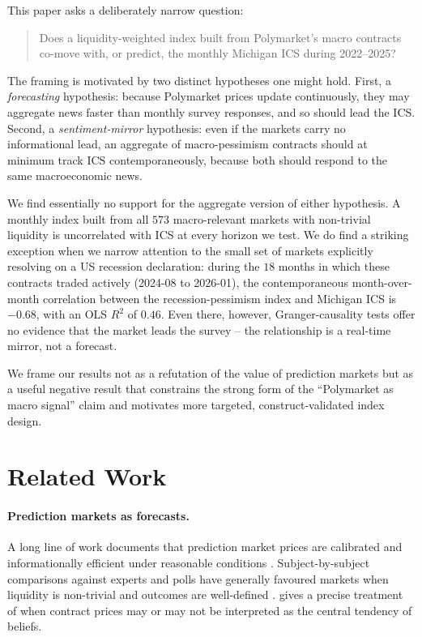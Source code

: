 \documentclass{article}
\begin{document}
This paper asks a deliberately narrow question:
\begin{quote}
Does a liquidity-weighted index built from Polymarket's macro contracts
co-move with, or predict, the monthly Michigan ICS during 2022--2025?
\end{quote}

The framing is motivated by two distinct hypotheses one might hold. First,
a \emph{forecasting} hypothesis: because Polymarket prices update
continuously, they may aggregate news faster than monthly survey responses,
and so should lead the ICS. Second, a \emph{sentiment-mirror} hypothesis:
even if the markets carry no informational lead, an aggregate of
macro-pessimism contracts should at minimum track ICS contemporaneously,
because both should respond to the same macroeconomic news.

We find essentially no support for the aggregate version of either
hypothesis. A monthly index built from all $573$ macro-relevant markets
with non-trivial liquidity is uncorrelated with ICS at every horizon we
test. We do find a striking exception when we narrow attention to the
small set of markets explicitly resolving on a US recession declaration:
during the $18$ months in which these contracts traded actively
(2024-08 to 2026-01), the contemporaneous month-over-month
correlation between the recession-pessimism index and Michigan ICS is
$-0.68$, with an OLS $R^2$ of $0.46$. Even there, however,
Granger-causality tests offer no evidence that the market leads the
survey -- the relationship is a real-time mirror, not a forecast.

We frame our results not as a refutation of the value of prediction
markets but as a useful negative result that constrains the strong form
of the ``Polymarket as macro signal'' claim and motivates more targeted,
construct-validated index design.

\section{Related Work}

\paragraph{Prediction markets as forecasts.}
A long line of work documents that prediction market prices are
calibrated and informationally efficient under reasonable conditions
\citep{wolfers2004prediction, berg2008long, page2013do,
arrow2008promise, snowberg2013prediction}. Subject-by-subject
comparisons against experts and polls have generally favoured markets
when liquidity is non-trivial and outcomes are well-defined
\citep{berg2008long, atanasov2017distilling}. \cite{manski2006interpreting}
gives a precise treatment of when contract prices may or may not be
interpreted as the central tendency of beliefs.
\end{document}
